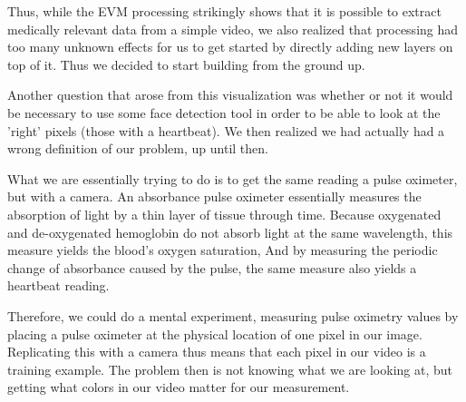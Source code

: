 \documentclass[12pt]{article}
\begin{document}
  Thus, while the EVM processing strikingly shows that it is possible to extract medically relevant data from a simple video, we also realized that processing had too many 
  unknown effects for us to get started by directly adding new layers on top of it. Thus we decided to start building from the ground up.

  Another question that arose from this visualization was whether or not it would be necessary to use some face detection tool in order to be able to look at the 'right' pixels (those with a heartbeat). We then realized we had actually had a wrong definition of our problem, up until then.

  What we are essentially trying to do is to get the same reading a pulse oximeter, but with a camera.
  An absorbance pulse oximeter essentially measures the absorption of light by a thin layer of tissue through time. Because oxygenated and de-oxygenated hemoglobin do not absorb light at the same wavelength, this measure yields the blood's oxygen saturation, And by measuring the periodic change of absorbance caused by the pulse, the same measure also yields a heartbeat reading.

  Therefore, we could do a mental experiment, measuring pulse oximetry values by placing a pulse oximeter at the physical location of one pixel in our image. Replicating this with a camera thus means that each pixel in our video is a training example. The problem then is not knowing what we are looking at, but getting what colors in our video
  matter for our measurement.

\end{document}
